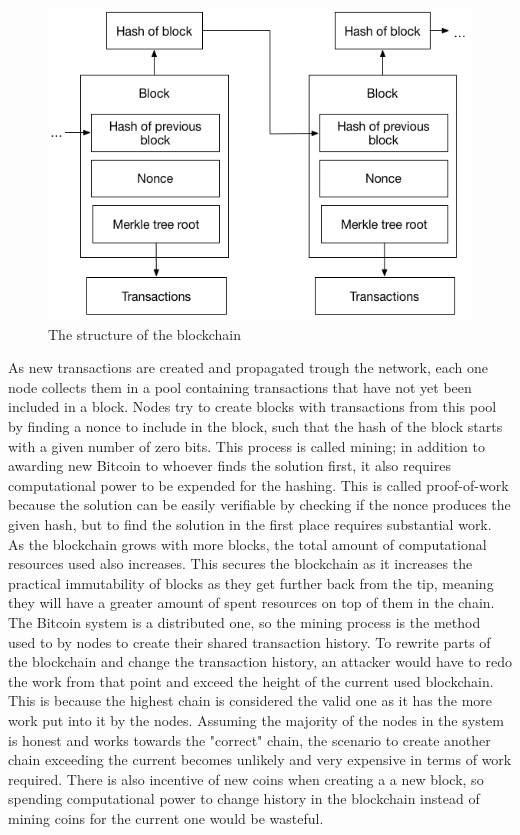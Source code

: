 \begin{figure}[h]  %
  \centering
  \includegraphics[width=.7\textwidth]{figures/blockchain}
  \caption{The structure of the blockchain}
  \label{fig:blockchain}
\end{figure}

As new transactions are created and propagated trough the network, each one node collects them in a pool containing transactions that have not yet been included in a block. Nodes try to create blocks with transactions from this pool by finding a nonce to include in the block, such that the hash of the block starts with a given number of zero bits. This process is called mining; in addition to awarding new Bitcoin to whoever finds the solution first, it also requires computational power to be expended for the hashing. This is called proof-of-work because the solution can be easily verifiable by checking if the nonce produces the given hash, but to find the solution in the first place requires substantial work. As the blockchain grows with more blocks, the total amount of computational resources used also increases. This secures the blockchain as it increases the practical immutability of blocks as they get further back from the tip, meaning they will have a greater amount of spent resources on top of them in the chain. The Bitcoin system is a distributed one, so the mining process is the method used to by nodes to create their shared transaction history.
To rewrite parts of the blockchain and change the transaction history, an attacker would have to redo the work from that point and exceed the height of the current used blockchain. This is because the highest chain is considered the valid one as it has the more work put into it by the nodes. Assuming the majority of the nodes in the system is honest and works towards the "correct" chain, the scenario to create another chain exceeding the current becomes unlikely and very expensive in terms of work required. There is also incentive of new coins when creating a a new block, so spending computational power to change history in the blockchain instead of mining coins for the current one would be wasteful. 


